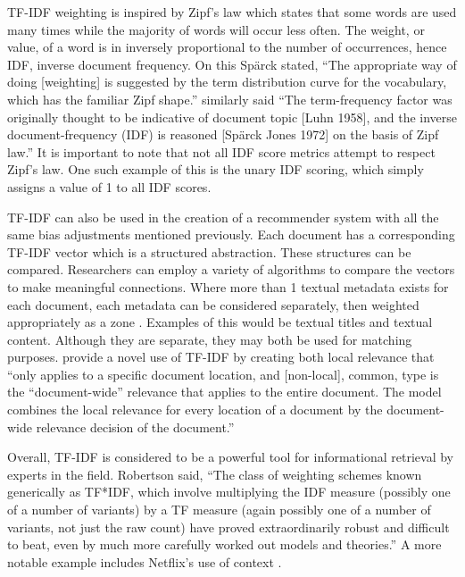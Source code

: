 TF-IDF weighting is inspired by Zipf's law which states that some words are used many times while the majority of words will occur less often. The weight, or value, of a word is in inversely proportional to the number of occurrences, hence IDF, inverse document frequency. On this Sp\"{a}rck stated, ``The appropriate way of doing [weighting] is suggested by the term distribution curve for the vocabulary, which has the familiar Zipf shape.'' \citep{Wu:2008:Interpreting_tf_idf_term_weights} similarly said ``The term-frequency factor was originally thought to be indicative of document topic [Luhn 1958], and the inverse document-frequency (IDF) is reasoned [Sp\"arck Jones 1972] on the basis of Zipf law.'' It is important to note that not all IDF score metrics attempt to respect Zipf's law. One such example of this is the unary IDF scoring, which simply assigns a value of 1 to all IDF scores.

TF-IDF can also be used in the creation of a recommender system with all the same bias adjustments mentioned previously. Each document has a corresponding TF-IDF vector which is a structured abstraction. These structures can be compared. Researchers can employ a variety of algorithms to compare the vectors to make meaningful connections. %
Where more than 1 textual metadata exists for each document, each metadata can be considered separately, then weighted appropriately as a zone \citep{manning_raghavan_2008_scoring}. Examples of this would be textual titles and textual content. Although they are separate, they may both be used for matching purposes. \citet{Wu:2008:Interpreting_tf_idf_term_weights} provide a novel use of TF-IDF by creating both local relevance that ``only applies to a specific document location, and [non-local], common, type is the ``document-wide'' relevance that applies to the entire document. The model combines the local relevance for every location of a document by the document-wide relevance decision of the document.''

Overall, TF-IDF is considered to be a powerful tool for informational retrieval by experts in the field. Robertson \citeyearpar{understanding_idf_2004} said, ``The class of weighting schemes known generically as TF*IDF, which involve multiplying the IDF measure (possibly one of a number of variants) by a TF measure (again possibly one of a number of variants, not just the raw count) have proved extraordinarily robust and difficult to beat, even by much more carefully worked out models and theories.'' A more notable example includes Netflix’s use of context \citep{Bell:2007:lessons_from_the_netflix_prize}.

